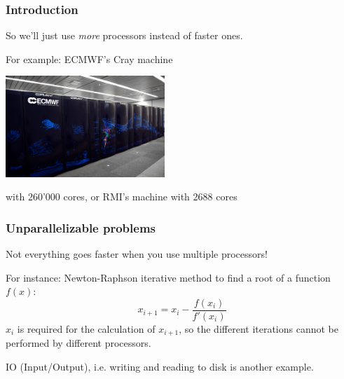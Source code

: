 \documentclass[aspectratio=43,9pt]{beamer}
\begin{document}
%
%
\begin{frame}
	\frametitle{Introduction}
	\begin{myitemize}{2ex}
		\item So we'll just use \emph{more} processors instead of faster ones.
		\item For example: ECMWF's Cray machine
			\begin{center}\vspace*{2ex}
				\includegraphics[width=6cm]{cray}
			\end{center}\vspace*{2ex}
			with 260'000 cores, or RMI's machine with 2688 cores
	\end{myitemize}
\end{frame}
%
%
\begin{frame}
	\frametitle{Unparallelizable problems}
	\begin{myitemize}{2ex}
		\item Not everything goes faster when you use multiple processors!
		\item For instance: Newton-Raphson iterative method to find a root of a function $f(x)$:
			\begin{equation*}
				x_{i+1}=x_i-\frac{f(x_i)}{f'(x_i)}
			\end{equation*}
			$x_i$ is required for the calculation of $x_{i+1}$, so the different iterations cannot be performed by different processors.
		\item IO (Input/Output), i.e. writing and reading to disk is another example.
	\end{myitemize}
\end{frame}
%
%
\end{document}
